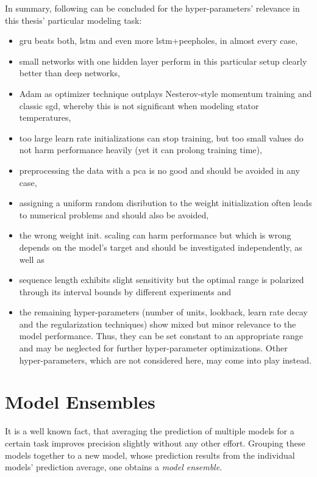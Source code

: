 In summary, following can be concluded for the hyper-parameters' relevance in this thesis' particular modeling task:
\begin{itemize}
	\item \gls{gru} beats both, \gls{lstm} and even more \gls{lstm}+peepholes, in almost every case,
	\item small networks with one hidden layer perform in this particular setup clearly better than deep networks,
	\item Adam as optimizer technique outplays Nesterov-style momentum training and classic \gls{sgd}, whereby this is not significant when modeling stator temperatures,
	\item too large learn rate initializations can stop training, but too small values do not harm performance heavily (yet it can prolong training time),
	\item preprocessing the data with a \gls{pca} is no good and should be avoided in any case,
	\item assigning a uniform random disribution to the weight initialization often leads to numerical problems and should also be avoided,
	\item the wrong weight init. scaling can harm performance but which is wrong depends on the model's target and should be investigated independently, as well as
	\item sequence length exhibits slight sensitivity but the optimal range is polarized through its interval bounds by different experiments and
	\item the remaining hyper-parameters (number of units, lookback, learn rate decay and the regularization techniques) show mixed but minor relevance to the model performance. Thus, they can be set constant to an appropriate range and may be neglected for further hyper-parameter optimizations. 
Other hyper-parameters, which are not considered here, may come into play instead.
\end{itemize}

\section{Model Ensembles}
It is a well known fact, that averaging the prediction of multiple models for a certain task improves precision slightly without any other effort.
Grouping these models together to a new model, whose prediction results from the individual models' prediction average, one obtains a \textit{model ensemble}.

